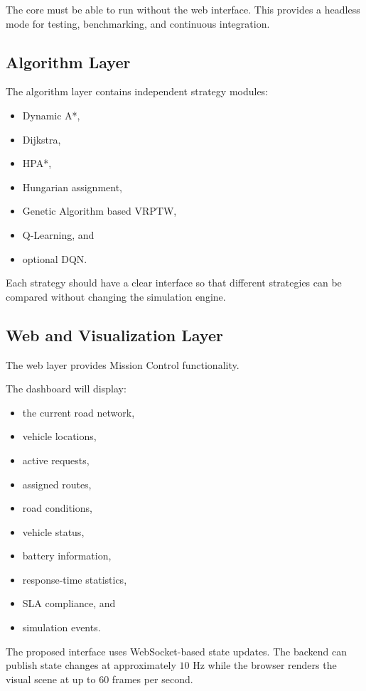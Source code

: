 \documentclass[12pt,a4paper]{article}
\begin{document}
The core must be able to run without the web interface. This provides
a headless mode for testing, benchmarking, and continuous integration.

\subsection{Algorithm Layer}

The algorithm layer contains independent strategy modules:

\begin{itemize}
    \item Dynamic A*,
    \item Dijkstra,
    \item HPA*,
    \item Hungarian assignment,
    \item Genetic Algorithm based VRPTW,
    \item Q-Learning, and
    \item optional DQN.
\end{itemize}

Each strategy should have a clear interface so that different
strategies can be compared without changing the simulation engine.

\subsection{Web and Visualization Layer}

The web layer provides Mission Control functionality.

The dashboard will display:

\begin{itemize}
    \item the current road network,
    \item vehicle locations,
    \item active requests,
    \item assigned routes,
    \item road conditions,
    \item vehicle status,
    \item battery information,
    \item response-time statistics,
    \item SLA compliance, and
    \item simulation events.
\end{itemize}

The proposed interface uses WebSocket-based state updates. The
backend can publish state changes at approximately $10$ Hz while the
browser renders the visual scene at up to $60$ frames per second.
\end{document}
